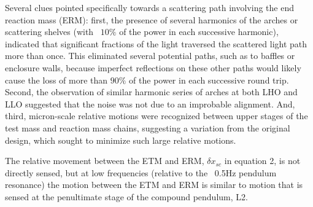 \documentclass[12pt]{iopart}
\begin{document}

 
Several clues pointed specifically towards a scattering path involving the end reaction mass (ERM): first, the presence of several harmonics of the arches or scattering shelves (with ~$10\%$ of the power in each successive harmonic), indicated that significant fractions of the light traversed the scattered light path more than once. This eliminated several potential paths, such as to baffles or enclosure walls, because imperfect reflections on these other paths would likely cause the loss of more than $90\%$ of the power in each successive round trip. Second, the observation of similar harmonic series of arches at both LHO and LLO suggested that the noise was not due to an improbable alignment. And, third, micron-scale relative motions were recognized between upper stages of the test mass and reaction mass chains, suggesting a variation from the original design, which sought to minimize such large relative motions. 
 
The relative movement between the ETM and ERM, ${\delta x_{sc}}$ in equation 2, is not directly sensed, but at low frequencies (relative to the ~0.5Hz pendulum resonance) the motion between the ETM and ERM is similar to motion that is sensed at the penultimate stage of the compound pendulum, L2.

\end{document}
